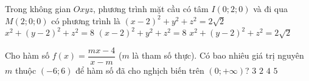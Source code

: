 \begin{ex}%
	Trong không gian $Oxyz$, phương trình mặt cầu có tâm $I(0;2;0)$ và đi qua $M(2;0;0)$ có phương trình là
	\choice
	{$(x-2)^2+y^2+z^2=2\sqrt{2}$}
	{\True $x^2+(y-2)^2+z^2=8$}
	{$(x-2)^2+y^2+z^2=8$}
	{$x^2+(y-2)^2+z^2=2\sqrt{2}$}
\end{ex}

\begin{ex}%
	Cho hàm số $f(x)=\dfrac{mx-4}{x-m}$ ($m$ là tham số thực). Có bao nhiêu giá trị nguyên $m$ thuộc $(-6;6)$ để hàm số đã cho nghịch biến trên $(0;+\infty)$?
	\choice
	{\True $3$}
	{$2$}
	{$4$}
	{$5$}
\end{ex}

